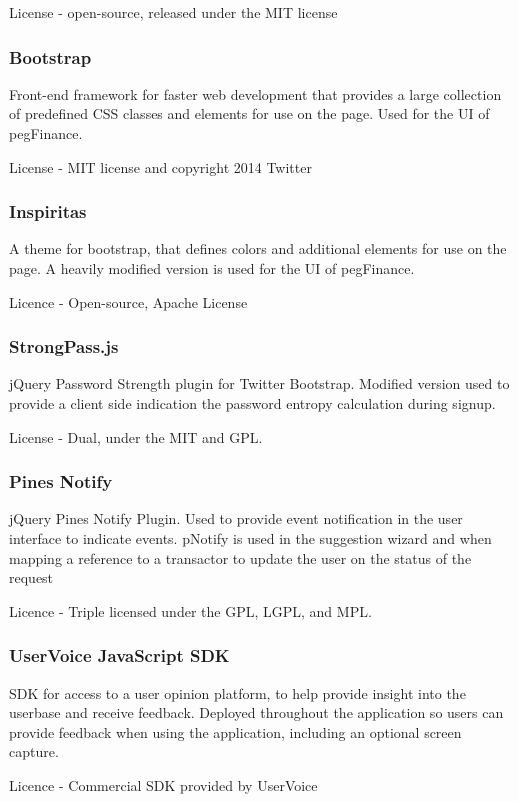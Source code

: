 \begin{appendices}
License - open-source, released under the MIT license

\subsubsection{Bootstrap}
Front-end framework for faster web development that provides a large collection of predefined CSS classes and elements for use on the page.
%
Used for the UI of pegFinance.

License - MIT license and copyright 2014 Twitter

\subsubsection{Inspiritas}
A theme for bootstrap, that defines colors and additional elements for use on the page.
%
A heavily modified version is used for the UI of pegFinance.

Licence - Open-source, Apache License

\subsubsection{StrongPass.js}
jQuery Password Strength plugin for Twitter Bootstrap.
%
Modified version used to provide a client side indication the password entropy calculation during signup.

License - Dual, under the MIT and GPL.

\subsubsection{Pines Notify}
jQuery Pines Notify Plugin. Used to provide event notification in the user interface to indicate events.
%
pNotify is used in the suggestion wizard and when mapping a reference to a transactor to update the user on the status of the request

Licence - Triple licensed under the GPL, LGPL, and MPL.

\subsubsection{UserVoice JavaScript SDK}
SDK for access to a user opinion platform, to help provide insight into the userbase and receive feedback.
%
Deployed throughout the application so users can provide feedback when using the application, including an optional screen capture.

Licence - Commercial SDK provided by UserVoice


\end{appendices}
